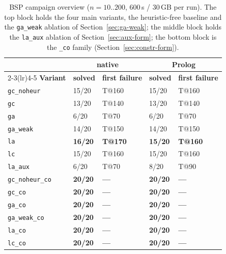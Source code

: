 \begin{table}[H]
\centering
\small
\begin{tabular}{lllll}
\toprule
 & \multicolumn{2}{c}{\textbf{native}} & \multicolumn{2}{c}{\textbf{Prolog}}\\
\cmidrule(lr){2-3}\cmidrule(lr){4-5}
\textbf{Variant} & \textbf{solved} & \textbf{first failure} & \textbf{solved} & \textbf{first failure}\\
\midrule
\texttt{gc\_noheur} & 15/20 & T@160 & 15/20 & T@160\\
\texttt{gc}        & 13/20 & T@140 & 13/20 & T@140\\
\texttt{ga}        & 6/20  & T@70  & 6/20  & T@70\\
\texttt{ga\_weak}   & 14/20 & T@150 & 14/20 & T@150\\
\texttt{la}        & \textbf{16/20} & \textbf{T@170} & \textbf{15/20} & \textbf{T@160}\\
\texttt{lc}        & 15/20 & T@160 & 15/20 & T@160\\
\midrule[\lightrulewidth]
\texttt{la\_aux}    & 6/20  & T@70  & 8/20  & T@90\\
\midrule[\lightrulewidth]
\texttt{gc\_noheur\_co} & \textbf{20/20} & \textbf{---} & \textbf{20/20} & \textbf{---}\\
\texttt{gc\_co}     & \textbf{20/20} & \textbf{---} & \textbf{20/20} & \textbf{---}\\
\texttt{ga\_co}     & \textbf{20/20} & \textbf{---} & \textbf{20/20} & \textbf{---}\\
\texttt{ga\_weak\_co} & \textbf{20/20} & \textbf{---} & \textbf{20/20} & \textbf{---}\\
\texttt{la\_co}     & \textbf{20/20} & \textbf{---} & \textbf{20/20} & \textbf{---}\\
\texttt{lc\_co}     & \textbf{20/20} & \textbf{---} & \textbf{20/20} & \textbf{---}\\
\bottomrule
\end{tabular}
\caption{BSP campaign overview ($n=10..200$, 600\,s / 30\,GB per run). The top block holds the four main variants, the heuristic-free baseline and the \texttt{ga\_weak} ablation of Section~\ref{sec:ga-weak}; the middle block holds the \texttt{la\_aux} ablation of Section~\ref{sec:aux-form}; the bottom block is the \texttt{\_co} family (Section~\ref{sec:constr-form}).}
\label{tab:overview-bsp}
\end{table}

